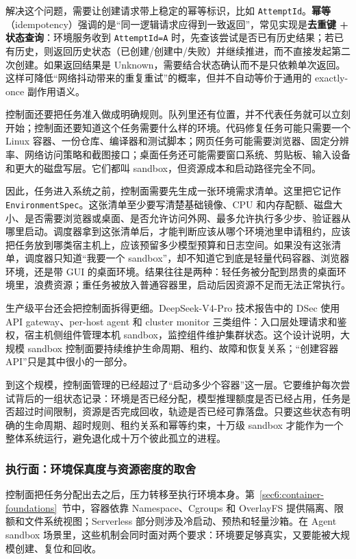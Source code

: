解决这个问题，需要让创建请求带上稳定的幂等标识，比如 \texttt{AttemptId}。\textbf{幂等}（idempotency）强调的是“同一逻辑请求应得到一致返回”，常见实现是\textbf{去重键 + 状态查询}：环境服务收到 \texttt{AttemptId=A} 时，先查该尝试是否已有历史结果；若已有历史，则返回历史状态（已创建/创建中/失败）并继续推进，而不直接发起第二次创建。如果返回结果是 Unknown，需要结合状态确认而不是只依赖单次返回。这样可降低“网络抖动带来的重复重试”的概率，但并不自动等价于通用的 exactly-once 副作用语义。

控制面还要把任务准入做成明确规则。队列里还有位置，并不代表任务就可以立刻开始；控制面还要知道这个任务需要什么样的环境。代码修复任务可能只需要一个 Linux 容器、一份仓库、编译器和测试脚本；网页任务可能需要浏览器、固定分辨率、网络访问策略和截图接口；桌面任务还可能需要窗口系统、剪贴板、输入设备和更大的磁盘写层。它们都叫 sandbox，但资源成本和启动路径完全不同。

因此，任务进入系统之前，控制面需要先生成一张环境需求清单。这里把它记作 \texttt{EnvironmentSpec}。这张清单至少要写清楚基础镜像、CPU 和内存配额、磁盘大小、是否需要浏览器或桌面、是否允许访问外网、最多允许执行多少步、验证器从哪里启动。调度器拿到这张清单后，才能判断应该从哪个环境池里申请租约，应该把任务放到哪类宿主机上，应该预留多少模型预算和日志空间。如果没有这张清单，调度器只知道“我要一个 sandbox”，却不知道它到底是轻量代码容器、浏览器环境，还是带 GUI 的桌面环境。结果往往是两种：轻任务被分配到昂贵的桌面环境里，浪费资源；重任务被放入普通容器里，启动后因资源不足而无法正常执行。

生产级平台还会把控制面拆得更细。DeepSeek-V4-Pro 技术报告中的 DSec 使用 API gateway、per-host agent 和 cluster monitor 三类组件：入口层处理请求和鉴权，宿主机侧组件管理本机 sandbox，监控组件维护集群状态。这个设计说明，大规模 sandbox 控制面要持续维护生命周期、租约、故障和恢复关系；“创建容器 API”只是其中很小的一部分。

到这个规模，控制面管理的已经超过了“启动多少个容器”这一层。它要维护每次尝试背后的一组状态记录：环境是否已经分配，模型推理额度是否已经占用，任务是否超过时间限制，资源是否完成回收，轨迹是否已经可靠落盘。只要这些状态有明确的生命周期、超时规则、租约关系和幂等约束，十万级 sandbox 才能作为一个整体系统运行，避免退化成十万个彼此孤立的进程。

\subsubsection{执行面：环境保真度与资源密度的取舍}
\label{sec6:agent-execution-plane}

控制面把任务分配出去之后，压力转移至执行环境本身。第~\ref{sec6:container-foundations}~节中，容器依靠 Namespace、Cgroups 和 OverlayFS 提供隔离、限额和文件系统视图；Serverless 部分则涉及冷启动、预热和轻量沙箱。在 Agent sandbox 场景里，这些机制会同时面对两个要求：环境要足够真实，又要能被大规模创建、复位和回收。

